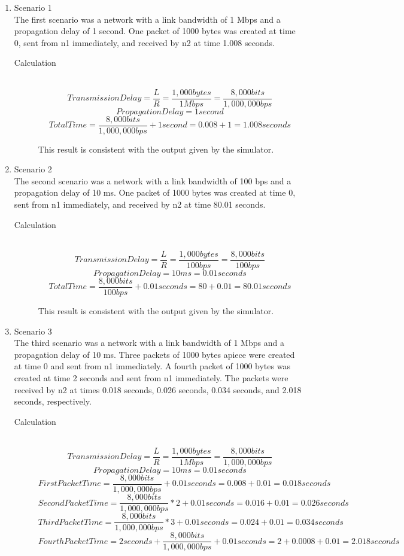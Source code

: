 \documentclass[11pt]{article}
\begin{document}
\begin{enumerate}
\item Scenario 1 \hfill \\
The first scenario was a network with a link bandwidth of 1 Mbps and a propagation delay of 1 second. One packet of 1000 bytes was created at time 0, sent from n1 immediately, and received by n2 at time 1.008 seconds.

\begin{description}
\item[Calculation] \hfill \\
$$Transmission Delay = \frac{L}{R} = \frac{1,000 bytes}{1 Mbps} = \frac{8,000 bits}{1,000,000 bps}$$
$$Propagation Delay = 1 second$$
$$TotalTime = \frac{8,000 bits}{1,000,000 bps} + 1 second = 0.008 + 1 = 1.008 seconds$$

This result is consistent with the output given by the simulator.
\end{description}

\item Scenario 2 \hfill \\
The second scenario was a network with a link bandwidth of 100 bps and a propagation delay of 10 ms. One packet of 1000 bytes was created at time 0, sent from n1 immediately, and received by n2 at time 80.01 seconds.

\begin{description}
\item[Calculation] \hfill \\
$$Transmission Delay = \frac{L}{R} = \frac{1,000 bytes}{100 bps} = \frac{8,000 bits}{100 bps}$$
$$Propagation Delay = 10 ms = 0.01 seconds$$
$$TotalTime = \frac{8,000 bits}{100 bps} + 0.01 seconds = 80 + 0.01 = 80.01 seconds$$

This result is consistent with the output given by the simulator.
\end{description}

\item Scenario 3 \hfill \\
The third scenario was a network with a link bandwidth of 1 Mbps and a propagation delay of 10 ms. Three packets of 1000 bytes apiece were created at time 0 and sent from n1 immediately. A fourth packet of 1000 bytes was created at time 2 seconds and sent from n1 immediately. The packets were received by n2 at times 0.018 seconds, 0.026 seconds, 0.034 seconds, and 2.018 seconds, respectively.

\begin{description}
\item[Calculation] \hfill \\
$$Transmission Delay = \frac{L}{R} = \frac{1,000 bytes}{1 Mbps} = \frac{8,000 bits}{1,000,000 bps}$$
$$Propagation Delay = 10 ms = 0.01 seconds$$
$$FirstPacketTime = \frac{8,000 bits}{1,000,000 bps} + 0.01 seconds = 0.008 + 0.01 = 0.018 seconds$$
$$SecondPacketTime = \frac{8,000 bits}{1,000,000 bps}*2 + 0.01 seconds = 0.016 + 0.01 = 0.026 seconds$$
$$ThirdPacketTime = \frac{8,000 bits}{1,000,000 bps}*3 + 0.01 seconds = 0.024 + 0.01 = 0.034 seconds$$
$$FourthPacketTime = 2 seconds + \frac{8,000 bits}{1,000,000 bps} + 0.01 seconds = 2 + 0.0008 + 0.01 = 2.018 seconds$$


\end{description}
\end{enumerate}
\end{document}
